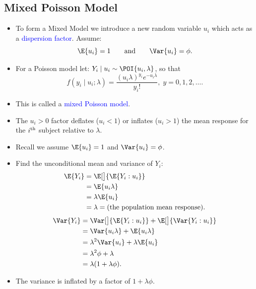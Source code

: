 \documentclass[oneside]{book}\usepackage[]{graphicx}\usepackage[svgnames]{xcolor}
\providecommand\given{} %
\renewcommand\given{\nonscript\:\delimsize\vert\nonscript\:\mathopen{}}%
\renewcommand\given{\nonscript\:\delimsize\vert\nonscript\:\mathopen{}}%
\renewcommand\given{\nonscript\:\delimsize\vert\nonscript\:\mathopen{}}%
\renewcommand\given{\nonscript\:\delimsize\vert\nonscript\:\mathopen{}}%
\renewcommand\given{\nonscript\:\delimsize\vert\nonscript\:\mathopen{}}%
\renewcommand\given{\nonscript\:\delimsize\vert\nonscript\:\mathopen{}}%
\renewcommand\given{\nonscript\:\delimsize\vert\nonscript\:\mathopen{}}%
\renewcommand\given{\nonscript\:\delimsize\vert\nonscript\:\mathopen{}}%
\renewcommand\given{\nonscript\:\delimsize\vert\nonscript\:\mathopen{}}%
\renewcommand\given{\nonscript\:\delimsize\vert\nonscript\:\mathopen{}}%
\renewcommand\given{\nonscript\:\delimsize\vert\nonscript\:\mathopen{}}%
\renewcommand\given{\nonscript\:\delimsize\vert\nonscript\:\mathopen{}}%
\renewcommand\given{:}
\begin{document}
\subsection*{Mixed Poisson Model}
\begin{itemize}
    \item To form a Mixed Model we introduce a new random variable $ u_i $ which acts as a
          \textcolor{Blue}{dispersion factor}. Assume:
          \[ \E{u_i}=1\qquad \text{and}\qquad \Var{u_i}=\phi. \]
    \item For a Poisson model let: $ Y_i\mid u_i \sim \POI{u_i,\lambda} $, so that
          \[ f(y_i\mid u_i;\lambda)=\frac{(u_i\lambda)^{y_i}e^{-u_i\lambda}}{y_i!},\; y=0,1,2,\ldots. \]
    \item This is called a \textcolor{Blue}{mixed Poisson model}.
    \item The $ u_i>0 $ factor deflates ($ u_i<1 $) or inflates ($ u_i>1 $) the mean response for the $ i\textsuperscript{th} $ subject relative to $ \lambda $.
    \item Recall we assume $ \E{u_i}=1 $ and $ \Var{u_i}=\phi $.
    \item Find the unconditional mean and variance of $ Y_i $:
          \begin{align*}
              \E{Y_i}
               & =\E[\big]{\E{Y_i\given u_i}}                    \\
               & =\E{u_i\lambda}                                 \\
               & =\lambda\E{u_i}                                 \\
               & =\lambda=\text{(the population mean response)}.
          \end{align*}
          \begin{align*}
              \Var{Y_i}
               & =\Var[\big]{\E{Y_i\given u_i}}+\E[\big]{\Var{Y_i\given u_i}} \\
               & =\Var{u_i\lambda}+\E{u_i\lambda}                             \\
               & =\lambda^2\Var{u_i}+\lambda\E{u_i}                           \\
               & =\lambda^2 \phi+\lambda                                      \\
               & =\lambda(1+\lambda \phi).
          \end{align*}
    \item The variance is inflated by a factor of $ 1+\lambda\phi $.

\end{itemize}
\end{document}
